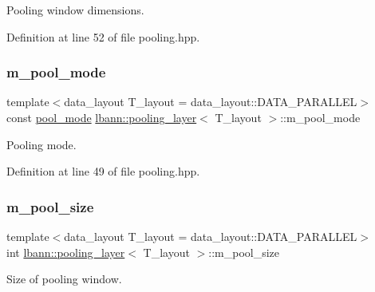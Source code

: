 Pooling window dimensions. 



Definition at line 52 of file pooling.\+hpp.

\mbox{\label{classlbann_1_1pooling__layer_a7b19407c88f89757e64ed3d4afab8443}} 
\subsubsection{\texorpdfstring{m\+\_\+pool\+\_\+mode}{m\_pool\_mode}}
{\footnotesize\ttfamily template$<$data\+\_\+layout T\+\_\+layout = data\+\_\+layout\+::\+D\+A\+T\+A\+\_\+\+P\+A\+R\+A\+L\+L\+EL$>$ \\
const \hyperlink{base_8hpp_ac47a6ee5278a53898222a48639a2bf39}{pool\+\_\+mode} \hyperlink{classlbann_1_1pooling__layer}{lbann\+::pooling\+\_\+layer}$<$ T\+\_\+layout $>$\+::m\+\_\+pool\+\_\+mode\hspace{0.3cm}{\ttfamily [private]}}



Pooling mode. 



Definition at line 49 of file pooling.\+hpp.

\mbox{\label{classlbann_1_1pooling__layer_a8b3a9020bb896a1132c9823bc2c73515}} 
\subsubsection{\texorpdfstring{m\+\_\+pool\+\_\+size}{m\_pool\_size}}
{\footnotesize\ttfamily template$<$data\+\_\+layout T\+\_\+layout = data\+\_\+layout\+::\+D\+A\+T\+A\+\_\+\+P\+A\+R\+A\+L\+L\+EL$>$ \\
int \hyperlink{classlbann_1_1pooling__layer}{lbann\+::pooling\+\_\+layer}$<$ T\+\_\+layout $>$\+::m\+\_\+pool\+\_\+size\hspace{0.3cm}{\ttfamily [private]}}



Size of pooling window. 



